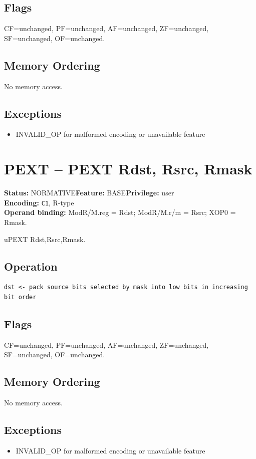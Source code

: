 \documentclass[10pt]{article}
\begin{document}
\subsection*{Flags}
CF=unchanged, PF=unchanged, AF=unchanged, ZF=unchanged, SF=unchanged, OF=unchanged.
\subsection*{Memory Ordering}
No memory access.
\subsection*{Exceptions}
\begin{itemize}
\item INVALID\_OP for malformed encoding or unavailable feature
\end{itemize}
\clearpage

\section{PEXT -- PEXT Rdst, Rsrc, Rmask}
\textbf{Status:} NORMATIVE\quad \textbf{Feature:} BASE\quad \textbf{Privilege:} user\\
\textbf{Encoding:} \texttt{C1}, R-type\\
\textbf{Operand binding:} ModR/M.reg = Rdst; ModR/M.r/m = Rsrc; XOP0 = Rmask.

uPEXT Rdst,Rsrc,Rmask.

\subsection*{Operation}
\begin{lstlisting}
dst <- pack source bits selected by mask into low bits in increasing bit order
\end{lstlisting}
\subsection*{Flags}
CF=unchanged, PF=unchanged, AF=unchanged, ZF=unchanged, SF=unchanged, OF=unchanged.
\subsection*{Memory Ordering}
No memory access.
\subsection*{Exceptions}
\begin{itemize}
\item INVALID\_OP for malformed encoding or unavailable feature
\end{itemize}
\clearpage
\end{document}
